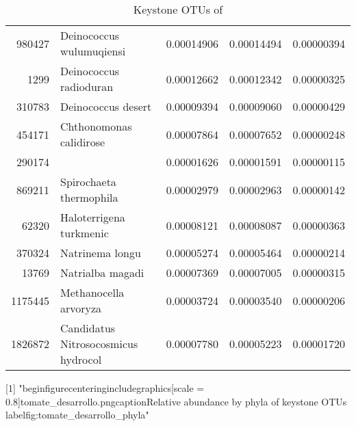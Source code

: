 \begin{table}[ht]
\begin{tabular}{rlrrr}
  980427 & Deinococcus wulumuqiensi & 0.00014906 & 0.00014494 & 0.00000394 \\ 
  1299 & Deinococcus radioduran & 0.00012662 & 0.00012342 & 0.00000325 \\ 
  310783 & Deinococcus desert & 0.00009394 & 0.00009060 & 0.00000429 \\ 
  454171 & Chthonomonas calidirose & 0.00007864 & 0.00007652 & 0.00000248 \\ 
  290174 &   & 0.00001626 & 0.00001591 & 0.00000115 \\ 
  869211 & Spirochaeta thermophila & 0.00002979 & 0.00002963 & 0.00000142 \\ 
  62320 & Haloterrigena turkmenic & 0.00008121 & 0.00008087 & 0.00000363 \\ 
  370324 & Natrinema longu & 0.00005274 & 0.00005464 & 0.00000214 \\ 
  13769 & Natrialba magadi & 0.00007369 & 0.00007005 & 0.00000315 \\ 
  1175445 & Methanocella arvoryza & 0.00003724 & 0.00003540 & 0.00000206 \\ 
  1826872 & Candidatus Nitrosocosmicus hydrocol & 0.00007780 & 0.00005223 & 0.00001720 \\ 
   \hline
\end{tabular}
\caption{Keystone OTUs of } 
\end{table}
[1] "begin{figure}\n    centering\n    includegraphics[scale = 0.8]{tomate_desarrollo.png}\n    caption{Relative abundance by phyla of keystone OTUs }\n    label{fig:tomate_desarrollo_phyla}"
